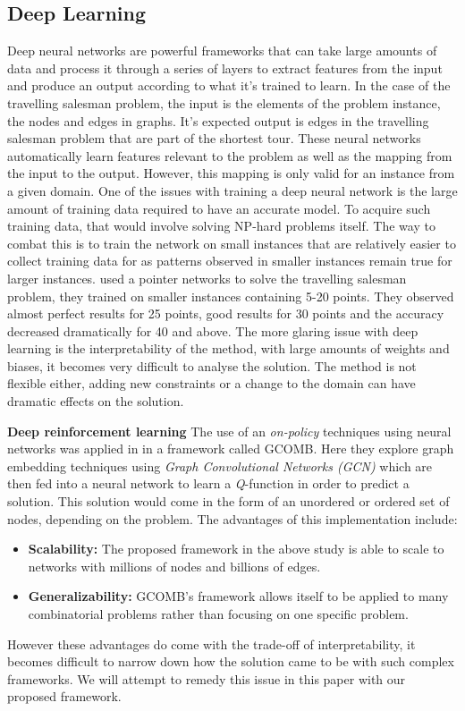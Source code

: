 \documentclass[]{UCD_CS_FYP_Report}
\begin{document}
\subsection{Deep Learning}
Deep neural networks are powerful frameworks that can take large amounts of data and process it through a series of layers to extract features from the input and produce an output according to what it’s trained to learn. In the case of the travelling salesman problem, the input is the elements of the problem instance, the nodes and edges in graphs. It’s expected output is edges in the travelling salesman problem that are part of the shortest tour. These neural networks automatically learn features relevant to the problem as well as the mapping from the input to the output. However, this mapping is only valid for an instance from a given domain. One of the issues with training a deep neural network is the large amount of training data required to have an accurate model. To acquire such training data, that would involve solving NP-hard problems itself. The way to combat this is to train the network on small instances that are relatively easier to collect training data for as patterns observed in smaller instances remain true for larger instances. \cite{NIPS2015_5866} used a pointer networks to solve the travelling salesman problem, they trained on smaller instances containing 5-20 points. They observed almost perfect results for 25 points, good results for 30 points and the accuracy decreased dramatically for 40 and above. The more glaring issue with deep learning is the interpretability of the method, with large amounts of weights and biases, it becomes very difficult to analyse the solution. The method is not flexible either, adding new constraints or a change to the domain can have dramatic effects on the solution.

\textbf{Deep reinforcement learning}
The use of an \textit{on-policy} techniques using neural networks was applied in \cite{DeepRL} in a framework called \textsc{GCOMB}. Here they explore graph embedding techniques using \textit{Graph Convolutional Networks (GCN)} which are then fed into a neural network to learn a \textit{Q}-function in order to predict a solution. This solution would come in the form of an unordered or ordered set of nodes, depending on the problem. The advantages of this implementation include: 
\begin{itemize}
  \item \textbf{Scalability: }The proposed framework in the above study is able to scale to networks with millions of nodes and billions of edges.
  \item \textbf{Generalizability: }\textsc{GCOMB}'s framework allows itself to be applied to many combinatorial problems rather than focusing on one specific problem.
\end{itemize}
However these advantages do come with the trade-off of interpretability, it becomes difficult to narrow down how the solution came to be with such complex frameworks. We will attempt to remedy this issue in this paper with our proposed framework.
\end{document}
